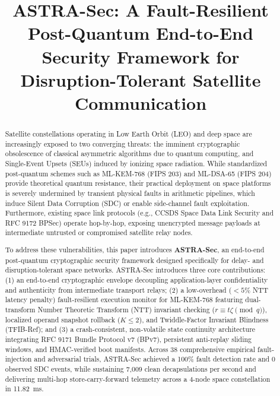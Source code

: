 \documentclass[conference,10pt]{IEEEtran}
\begin{document}
\title{ASTRA-Sec: A Fault-Resilient Post-Quantum End-to-End Security Framework for Disruption-Tolerant Satellite Communication}

\author{
}

\maketitle

\begin{abstract}
Satellite constellations operating in Low Earth Orbit (LEO) and deep space are increasingly exposed to two converging threats: the imminent cryptographic obsolescence of classical asymmetric algorithms due to quantum computing, and Single-Event Upsets (SEUs) induced by ionizing space radiation. While standardized post-quantum schemes such as ML-KEM-768 (FIPS 203) and ML-DSA-65 (FIPS 204) provide theoretical quantum resistance, their practical deployment on space platforms is severely undermined by transient physical faults in arithmetic pipelines, which induce Silent Data Corruption (SDC) or enable side-channel fault exploitation. Furthermore, existing space link protocols (e.g., CCSDS Space Data Link Security and RFC 9172 BPSec) operate hop-by-hop, exposing unencrypted message payloads at intermediate untrusted or compromised satellite relay nodes.

To address these vulnerabilities, this paper introduces \textbf{ASTRA-Sec}, an end-to-end post-quantum cryptographic security framework designed specifically for delay- and disruption-tolerant space networks. ASTRA-Sec introduces three core contributions: (1) an end-to-end cryptographic envelope decoupling application-layer confidentiality and authenticity from intermediate transport relays; (2) a low-overhead ($<5\%$ NTT latency penalty) fault-resilient execution monitor for ML-KEM-768 featuring dual-transform Number Theoretic Transform (NTT) invariant checking ($r \equiv t\zeta \pmod q$), localized operand snapshot rollback ($K \le 2$), and Twiddle-Factor Invariant Blindness (TFIB-Ref); and (3) a crash-consistent, non-volatile state continuity architecture integrating RFC 9171 Bundle Protocol v7 (BPv7), persistent anti-replay sliding windows, and HMAC-verified boot manifests. Across 38 comprehensive empirical fault-injection and adversarial trials, ASTRA-Sec achieved a 100\% fault detection rate and 0 observed SDC events, while sustaining 7,009 clean decapsulations per second and delivering multi-hop store-carry-forward telemetry across a 4-node space constellation in 11.82~ms.
\end{abstract}
\end{document}
